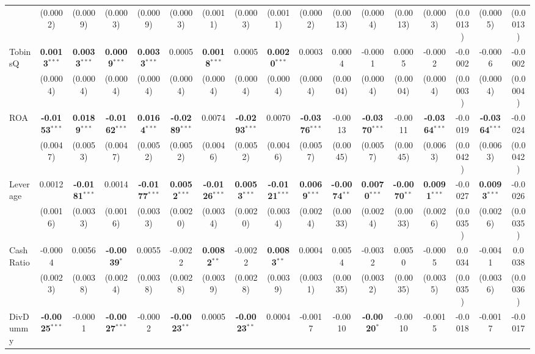 \documentclass[11pt,a4paper]{article}
\begin{document}
\begin{table}[htbp]
\begin{tabular}{lcccccccccccccccc}
 & (0.0002) & (0.0009) & (0.0003) & (0.0009) & (0.0003) & (0.0011) & (0.0003) & (0.0011) & (0.0002) & (0.0013) & (0.0004) & (0.0013) & (0.0003) & (0.0013) & (0.0005) & (0.0013) \\
TobinsQ & \textbf{0.0013}$^{***}$ & \textbf{0.0033}$^{***}$ & \textbf{0.0009}$^{***}$ & \textbf{0.0033}$^{***}$ & 0.0005 & \textbf{0.0018}$^{***}$ & 0.0005 & \textbf{0.0020}$^{***}$ & 0.0003 & 0.0004 & -0.0001 & 0.0005 & -0.0002 & -0.0002 & -0.0006 & -0.0002 \\
 & (0.0004) & (0.0004) & (0.0004) & (0.0004) & (0.0004) & (0.0004) & (0.0004) & (0.0004) & (0.0004) & (0.0004) & (0.0004) & (0.0004) & (0.0004) & (0.0003) & (0.0004) & (0.0004) \\
ROA & \textbf{-0.0153}$^{***}$ & \textbf{0.0189}$^{***}$ & \textbf{-0.0162}$^{***}$ & \textbf{0.0164}$^{***}$ & \textbf{-0.0289}$^{***}$ & 0.0074 & \textbf{-0.0293}$^{***}$ & 0.0070 & \textbf{-0.0376}$^{***}$ & -0.0013 & \textbf{-0.0370}$^{***}$ & -0.0011 & \textbf{-0.0364}$^{***}$ & -0.0019 & \textbf{-0.0364}$^{***}$ & -0.0024 \\
 & (0.0047) & (0.0053) & (0.0047) & (0.0052) & (0.0052) & (0.0046) & (0.0052) & (0.0046) & (0.0057) & (0.0045) & (0.0057) & (0.0045) & (0.0063) & (0.0042) & (0.0063) & (0.0042) \\
Leverage & 0.0012 & \textbf{-0.0181}$^{***}$ & 0.0014 & \textbf{-0.0177}$^{***}$ & \textbf{0.0052}$^{***}$ & \textbf{-0.0126}$^{***}$ & \textbf{0.0053}$^{***}$ & \textbf{-0.0121}$^{***}$ & \textbf{0.0069}$^{***}$ & \textbf{-0.0074}$^{**}$ & \textbf{0.0070}$^{***}$ & \textbf{-0.0070}$^{**}$ & \textbf{0.0091}$^{***}$ & -0.0027 & \textbf{0.0093}$^{***}$ & -0.0026 \\
 & (0.0016) & (0.0033) & (0.0016) & (0.0033) & (0.0020) & (0.0034) & (0.0020) & (0.0034) & (0.0024) & (0.0033) & (0.0024) & (0.0033) & (0.0026) & (0.0035) & (0.0026) & (0.0035) \\
CashRatio & -0.0004 & 0.0056 & \textbf{-0.0039}$^{*}$ & 0.0055 & -0.0022 & \textbf{0.0082}$^{**}$ & -0.0022 & \textbf{0.0083}$^{**}$ & 0.0004 & 0.0054 & -0.0032 & 0.0050 & -0.0005 & 0.0034 & -0.0041 & 0.0038 \\
 & (0.0023) & (0.0038) & (0.0024) & (0.0038) & (0.0028) & (0.0039) & (0.0028) & (0.0039) & (0.0031) & (0.0035) & (0.0032) & (0.0035) & (0.0035) & (0.0035) & (0.0036) & (0.0036) \\
DivDummy & \textbf{-0.0025}$^{***}$ & -0.0001 & \textbf{-0.0027}$^{***}$ & -0.0002 & \textbf{-0.0023}$^{**}$ & 0.0005 & \textbf{-0.0023}$^{**}$ & 0.0004 & -0.0017 & -0.0010 & \textbf{-0.0020}$^{*}$ & -0.0010 & -0.0015 & -0.0018 & -0.0017 & -0.0017 \\

\end{tabular}
\end{table}
\end{document}
